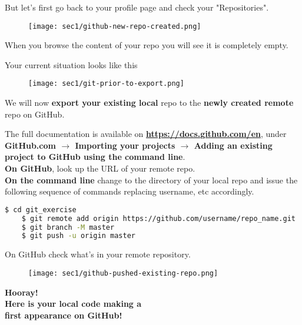 \begin{frame}[fragile]
\emptyframetitle

  But let's first go back to your profile page and check your "Repositories".\\[0.25cm]

  \begin{figure}[h]
    \texttt{[image: sec1/github-new-repo-created.png]}
  \end{figure}

  When you browse the content of your repo you will see it is completely empty.

\end{frame}


\begin{frame}[fragile]
\emptyframetitle

  Your current situation looks like this

  \begin{figure}[h]
    \texttt{[image: sec1/git-prior-to-export.png]}
  \end{figure}

  We will now \textbf{export your existing local} repo to the \textbf{newly created remote} repo on GitHub.

\end{frame}


\begin{frame}[fragile]
\emptyframetitle


  The full documentation is available on \textbf{\url{https://docs.github.com/en}}, under \textbf{GitHub.com $\rightarrow$ Importing your projects $\rightarrow$ Adding an existing project to GitHub using the command line}.\\[0.25cm]

  \textbf{On GitHub}, look up the URL of your remote repo.\\[0.25cm]

  \textbf{On the command line} change to the directory of your local repo and issue the following sequence of commands replacing username, etc accordingly.
  \begin{lstlisting}[language=bash]
    $ cd git_exercise
    $ git remote add origin https://github.com/username/repo_name.git
    $ git branch -M master
    $ git push -u origin master
  \end{lstlisting}

\end{frame}


\begin{frame}[fragile]
\emptyframetitle

  On GitHub check what's in your remote repository.
  \begin{figure}[h]
    \texttt{[image: sec1/github-pushed-existing-repo.png]}
  \end{figure}
  \vspace*{-2.5cm}
  \textbf{Hooray!\\[0.25cm] Here is your local code making a\\ first appearance on GitHub!}

\end{frame}


